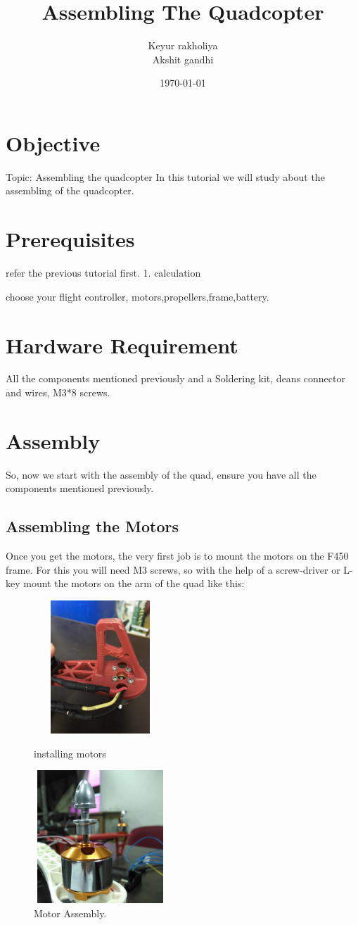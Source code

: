 \documentclass[11pt,a4paper]{article}
\title{Assembling The Quadcopter}
\author{Keyur rakholiya \\ Akshit gandhi}
\date{\today}
\begin{document}
	\maketitle
	\newpage
	\tableofcontents
	\newpage
	\section{Objective}
	Topic: Assembling the quadcopter
		In this tutorial we will study about the assembling of the quadcopter.
	\section{Prerequisites}
	refer the previous tutorial first.
	1. calculation
	
	choose your flight controller, motors,propellers,frame,battery.
	\section{Hardware Requirement}
	 All the components mentioned previously and a Soldering kit, deans connector and wires, M3*8 screws.
	\section{Assembly}
	 So, now we start with the assembly of the quad, ensure you have all the components mentioned previously.
	 \subsection{Assembling the Motors}
	 	Once you get the motors, the very first job is to mount the motors on the F450 frame. For this you will need M3 screws, so with the help of a screw-driver or L-key mount the motors on the arm of the quad like this:
	 	\begin{figure}[h]
	 	
	 	\centering
		\includegraphics[width=5cm,height=5cm]{screw}
		\caption{installing motors}
	 	\includegraphics[width=5cm,height=5cm]{mot}
	 	\caption{Motor Assembly.}
\end{figure}
\end{document}
